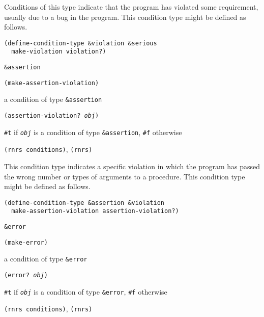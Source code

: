 Conditions of this type indicate that the program has violated
some requirement, usually due to a bug in the program.
This condition type might be defined as follows.

\begin{alltt}
(define-condition-type \&{}violation \&{}serious
  make-violation violation?)
\end{alltt}

\begin{description}

\label{exceptions_s21}\item[syntax] \texttt{\&{}assertion}



\item[procedure] \texttt{(make-assertion-violation)}



\item[returns] a condition of type \texttt{\&{}assertion}


\item[procedure] \texttt{(assertion-violation? \textit{obj})}



\item[returns] \texttt{\#{}t} if \texttt{\textit{obj}} is a condition of type \texttt{\&{}assertion}, \texttt{\#{}f} otherwise


\item[libraries] \texttt{(rnrs conditions)}, \texttt{(rnrs)}
\end{description}



This condition type indicates a specific violation in which 
the program has passed the wrong number or types of arguments to
a procedure.
This condition type might be defined as follows.

\begin{alltt}
(define-condition-type \&{}assertion \&{}violation
  make-assertion-violation assertion-violation?)
\end{alltt}

\begin{description}

\label{exceptions_s22}\item[syntax] \texttt{\&{}error}



\item[procedure] \texttt{(make-error)}



\item[returns] a condition of type \texttt{\&{}error}


\item[procedure] \texttt{(error? \textit{obj})}



\item[returns] \texttt{\#{}t} if \texttt{\textit{obj}} is a condition of type \texttt{\&{}error}, \texttt{\#{}f} otherwise


\item[libraries] \texttt{(rnrs conditions)}, \texttt{(rnrs)}
\end{description}



